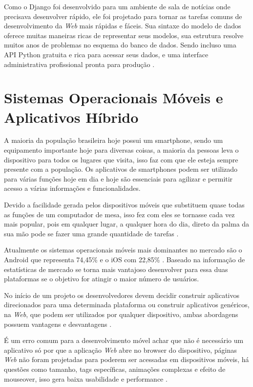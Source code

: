 \documentclass{ifto-tex}
\begin{document}
Como o Django foi desenvolvido para um ambiente de sala de notícias onde precisava desenvolver rápido, ele foi projetado para tornar as tarefas comuns de desenvolvimento da \textit{Web} mais rápidas e fáceis. Sua sintaxe do modelo de dados oferece muitas maneiras ricas de representar seus modelos, sua estrutura resolve muitos anos de problemas no esquema do banco de dados. Sendo incluso uma API Python gratuita e rica para acessar seus dados, e uma interface administrativa profissional pronta para produção \cite{Djangoem92:online}.


\section{Sistemas Operacionais Móveis e Aplicativos Híbrido}
A maioria da população brasileira hoje possui um smartphone, sendo um equipamento importante hoje para diversas coisas, a maioria da pessoas leva o dispositivo para todos os lugares que visita, isso faz com que ele esteja sempre presente com a população. Os aplicativos de smartphones podem ser utilizado para várias funções hoje em dia e hoje são essenciais para agilizar e permitir acesso a várias informações e funcionalidades.

Devido a facilidade gerada pelos dispositivos móveis que substituem quase todas as funções de um computador de mesa, isso fez com eles se tornasse cada vez mais popular, pois em qualquer lugar, a qualquer hora do dia, direto da palma da sua mão pode se fazer uma grande quantidade de tarefas \cite{Sistemas41:online}.

Atualmente os sistemas operacionais móveis mais dominantes no mercado são o Android que representa 74,45\% e o iOS com 22,85\% \cite{iOSvsAnd26:online}. Baseado na informação de estatísticas de mercado se torna mais vantajoso desenvolver para essa duas plataformas se o objetivo for atingir o maior número de usuários.

No início de um projeto os desenvolvedores devem decidir construir aplicativos direcionados para uma determinada plataforma ou construir aplicativos genéricos, na \textit{Web}, que podem ser utilizados por qualquer dispositivo, ambas abordagens possuem vantagens e desvantagens \cite{Aplicaco50:online}.

É um erro comum para a desenvolvimento móvel achar que não é necessário um aplicativo só por que a aplicação \textit{Web} abre no browser do dispositivo, páginas \textit{Web} não foram projetadas para poderem ser acessadas em dispositivos móveis, há questões como tamanho, tags específicas, animações complexas e efeito de mouseover, isso gera baixa usabilidade e performance \cite{Introduc9:online}.
\end{document}
